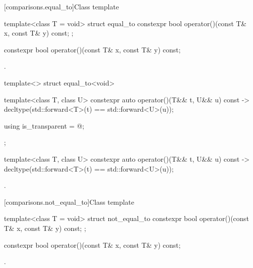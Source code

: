 [comparisons.equal_to]{Class template }

%
\begin{itemdecl}
template<class T = void> struct equal_to {
  constexpr bool operator()(const T& x, const T& y) const;
};
\end{itemdecl}

%
\begin{itemdecl}
constexpr bool operator()(const T& x, const T& y) const;
\end{itemdecl}

\begin{itemdescr}
\pnum\returns {}.
\end{itemdescr}

%
\begin{itemdecl}
template<> struct equal_to<void> {
  template<class T, class U> constexpr auto operator()(T&& t, U&& u) const
    -> decltype(std::forward<T>(t) == std::forward<U>(u));

  using is_transparent = @\unspec@;
};
\end{itemdecl}

%
\begin{itemdecl}
template<class T, class U> constexpr auto operator()(T&& t, U&& u) const
    -> decltype(std::forward<T>(t) == std::forward<U>(u));
\end{itemdecl}

\begin{itemdescr}
\pnum\returns {}.
\end{itemdescr}

[comparisons.not_equal_to]{Class template }

%
\begin{itemdecl}
template<class T = void> struct not_equal_to {
  constexpr bool operator()(const T& x, const T& y) const;
};
\end{itemdecl}

%
\begin{itemdecl}
constexpr bool operator()(const T& x, const T& y) const;
\end{itemdecl}

\begin{itemdescr}
\pnum\returns {}.
\end{itemdescr}

